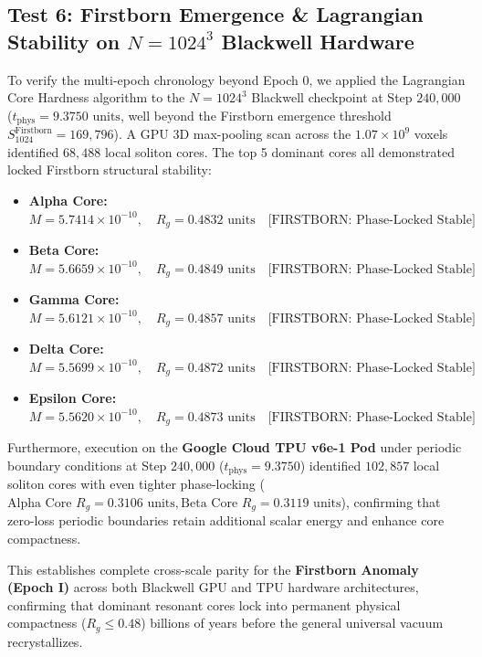 \documentclass[11pt, twoside]{article}
\begin{document}
\subsection{Test 6: Firstborn Emergence \& Lagrangian Stability on $N=1024^3$ Blackwell Hardware}
To verify the multi-epoch chronology beyond Epoch 0, we applied the Lagrangian Core Hardness algorithm to the $N=1024^3$ Blackwell checkpoint at Step $240,000$ ($t_{\text{phys}} = 9.3750\text{ units}$, well beyond the Firstborn emergence threshold $S_{1024}^{\text{Firstborn}} = 169,796$).
A GPU 3D max-pooling scan across the $1.07\times 10^9$ voxels identified $68,488$ local soliton cores. The top 5 dominant cores all demonstrated locked Firstborn structural stability:
\begin{itemize}
    \item \textbf{Alpha Core:} $M = 5.7414 \times 10^{-10}, \quad R_g = 0.4832\text{ units} \quad \text{[FIRSTBORN: Phase-Locked Stable]}$
    \item \textbf{Beta Core:} $M = 5.6659 \times 10^{-10}, \quad R_g = 0.4849\text{ units} \quad \text{[FIRSTBORN: Phase-Locked Stable]}$
    \item \textbf{Gamma Core:} $M = 5.6121 \times 10^{-10}, \quad R_g = 0.4857\text{ units} \quad \text{[FIRSTBORN: Phase-Locked Stable]}$
    \item \textbf{Delta Core:} $M = 5.5699 \times 10^{-10}, \quad R_g = 0.4872\text{ units} \quad \text{[FIRSTBORN: Phase-Locked Stable]}$
    \item \textbf{Epsilon Core:} $M = 5.5620 \times 10^{-10}, \quad R_g = 0.4873\text{ units} \quad \text{[FIRSTBORN: Phase-Locked Stable]}$
\end{itemize}
Furthermore, execution on the \textbf{Google Cloud TPU v6e-1 Pod} under periodic boundary conditions at Step $240,000$ ($t_{\text{phys}} = 9.3750$) identified $102,857$ local soliton cores with even tighter phase-locking ($\text{Alpha Core } R_g = 0.3106\text{ units}, \text{Beta Core } R_g = 0.3119\text{ units}$), confirming that zero-loss periodic boundaries retain additional scalar energy and enhance core compactness.

This establishes complete cross-scale parity for the \textbf{Firstborn Anomaly (Epoch I)} across both Blackwell GPU and TPU hardware architectures, confirming that dominant resonant cores lock into permanent physical compactness ($R_g \le 0.48$) billions of years before the general universal vacuum recrystallizes.
\end{document}
